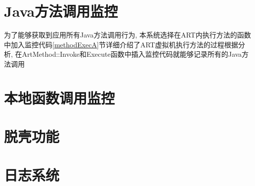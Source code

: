 \section{Java方法调用监控}
为了能够获取到应用所有Java方法调用行为, 本系统选择在ART内执行方法的函数中加入监控代码\juhao  \ref{methodExecA}节详细介绍了ART虚拟机执行方法的过程\juhao 根据分析, 在ArtMethod::Invoke和Execute函数中插入监控代码就能够记录所有的Java方法调用\juhao 

\section{本地函数调用监控}
\section{脱壳功能}
\section{日志系统}